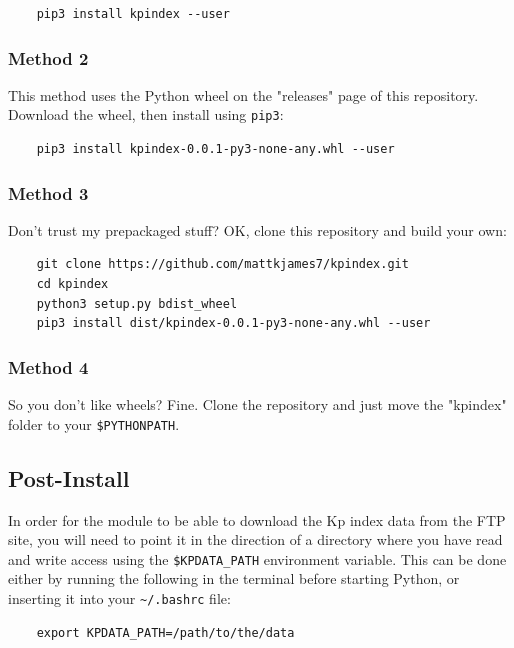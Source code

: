 	\begin{verbatim}
	pip3 install kpindex --user
	\end{verbatim}
	
	\subsubsection{Method 2}
	
	This method uses the Python wheel on the "releases" page of this 
	repository. Download the wheel, then install using \texttt{pip3}:
	
	\begin{verbatim}
	pip3 install kpindex-0.0.1-py3-none-any.whl --user
	\end{verbatim}
	
	\subsubsection{Method 3}
	
	Don't trust my prepackaged stuff? OK, clone this repository and build
	your own:
	
	\begin{verbatim}
	git clone https://github.com/mattkjames7/kpindex.git
	cd kpindex
	python3 setup.py bdist_wheel
	pip3 install dist/kpindex-0.0.1-py3-none-any.whl --user
	\end{verbatim}
	
	\subsubsection{Method 4}
	
	So you don't like wheels? Fine. Clone the repository and just move the
	"kpindex" folder to your \texttt{\$PYTHONPATH}.
	
	\subsection{Post-Install}
	
	In order for the module to be able to download the Kp index data from
	the FTP site, you will need to point it in the direction of a directory
	where you have read and write access using the \texttt{\$KPDATA\_PATH}
	environment variable. This can be done either by running the following
	in the terminal before starting Python, or inserting it into your 
	\texttt{\~{}/.bashrc} file:
	
	\begin{verbatim}
	export KPDATA_PATH=/path/to/the/data
	\end{verbatim}
	
